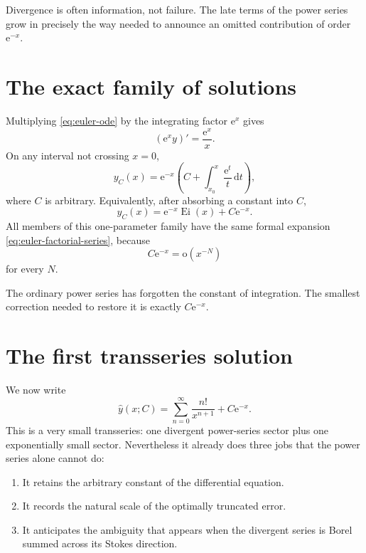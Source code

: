 \documentclass[11pt,openany]{book}
\theoremstyle{definition}
\theoremstyle{plain}
\theoremstyle{remark}
\newcommand{\dd}{\,\mathrm{d}}
\newcommand{\e}{\mathrm{e}}
\newcommand{\smallo}{\mathrm{o}}
\newcommand{\trans}[1]{\widehat{#1}}
\DeclareMathOperator{\Ei}{Ei}
\begin{document}
\begin{intuitionbox}
Divergence is often information, not failure. The late terms of the power series grow in precisely the way needed to announce an omitted contribution of order $\e^{-x}$.
\end{intuitionbox}

\section{The exact family of solutions}

Multiplying \cref{eq:euler-ode} by the integrating factor $\e^x$ gives
\[
 (\e^xy)'=\frac{\e^x}{x}.
\]
On any interval not crossing $x=0$,
\begin{equation}\label{eq:euler-exact-family}
 y_C(x)=\e^{-x}\left(C+\int_{x_0}^{x}\frac{\e^t}{t}\dd t\right),
\end{equation}
where $C$ is arbitrary. Equivalently, after absorbing a constant into $C$,
\[
 y_C(x)=\e^{-x}\Ei(x)+C\e^{-x}.
\]
All members of this one-parameter family have the same formal expansion \cref{eq:euler-factorial-series}, because
\[
 C\e^{-x}=\smallo(x^{-N})
\]
for every $N$.

The ordinary power series has forgotten the constant of integration. The smallest correction needed to restore it is exactly $C\e^{-x}$.

\section{The first transseries solution}

We now write
\begin{equation}\label{eq:first-transseries}
 \trans y(x;C)
 =\sum_{n=0}^{\infty}\frac{n!}{x^{n+1}}+C\e^{-x}.
\end{equation}
This is a very small transseries: one divergent power-series sector plus one exponentially small sector. Nevertheless it already does three jobs that the power series alone cannot do:

\begin{enumerate}
\item It retains the arbitrary constant of the differential equation.
\item It records the natural scale of the optimally truncated error.
\item It anticipates the ambiguity that appears when the divergent series is Borel summed across its Stokes direction.
\end{enumerate}
\end{document}
